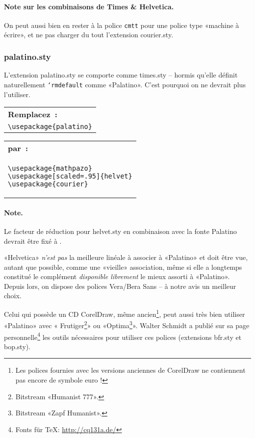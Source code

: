\documentclass[fontsize=11pt, paper=a4, pagesize, captions=tableheading, numbers=enddot, toc=graduated, footnotes=multiple]{scrartcl}%
\makeatletter
\DeclareRobustCommand*{\Macro}[1]{\mbox{\texttt{\char`\\#1}}}
\newcommand{\Paket}[1]{\textsf{#1.sty}\xspace}
\newenvironment{Ers}[1][\linewidth]{%
  \par\bigskip\noindent\marginline{\textcolor{gruen}{\boldmath $\triangleright$}}\begin{tabular}[t]{@{}p{0.5\textwidth}@{}}\textcolor{rot}{\textbf{\textsf{Remplacez~:}}%
}\\[2pt] \rahmenpr[#1]}%
{\endrahmenpr\end{tabular}}
\newenvironment{Dur}[1][0.5\textwidth]{%
\noindent\begin{tabular}[t]{@{}p{0.5\textwidth - 0.5em}@{}}\textcolor{gruen}{\textbf{\textsf{par~:}}}\\[2pt]\rahmenpg[#1]}%
{\endrahmenpg\end{tabular}\smallskip\noindent}
\makeatother
\begin{document}
\paragraph{Note sur les combinaisons de Times \& Helvetica.}
\label{sec:anmerkung-zu-allen}

On peut aussi bien en rester à la police \texttt{cmtt} pour une police type «machine à écrire», et ne pas charger du tout l'extension \Paket{courier}.

\subsubsection{\Paket{palatino}}
\label{sec:paketpalatino}

L'extension \Paket{palatino} se comporte comme \Paket{times} – hormis qu'elle définit naturellement \Macro{rmdefault} comme «Palatino». C'est pourquoi on ne devrait plus l'utiliser.
\begin{Ers}
  \verb+\usepackage{palatino}+
\end{Ers}
\begin{Dur}
\begin{verbatim}
\usepackage{mathpazo}
\usepackage[scaled=.95]{helvet}
\usepackage{courier}
\end{verbatim}
\end{Dur}

\paragraph{Note.}
\label{sec:anmerkung-2}

Le facteur de réduction pour \Paket{helvet} en combinaison avec la fonte Palatino devrait être fixé à .

«Helvetica» \emph{n'est pas} la meilleure linéale à associer à «Palatino» et doit être vue, autant que possible, comme une «vieille» association, même si elle a longtemps constitué le complément \emph{disponible librement} le mieux assorti à «Palatino». Depuis lors, on dispose des polices Vera/Bera Sans – à notre avis un meilleur choix.

Celui qui possède un CD CorelDraw\textsuperscript{\textregistered}, même ancien\footnote{Les polices fournies avec les versions anciennes de CorelDraw\textsuperscript{\textregistered} ne contiennent pas encore de symbole euro !}, peut aussi très bien utiliser «Palatino» avec « Frutiger\footnote{Bitstream «Humanist 777». }» ou «Optima\footnote{Bitstream «Zapf Humanist». }». Walter Schmidt a publié sur sa page personnelle\footnote{Fonts für \TeX : \url{http://cq131a.de/}} %
 les outils nécessaires pour utiliser ces polices (extensions \Paket{bfr} et \Paket{bop}).
\end{document}
